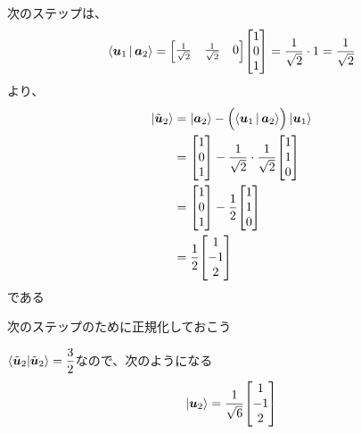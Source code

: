 \documentclass[../book_half_step_linear]{subfiles}
\begin{document}
次のステップは、
\begin{align*}
  \Braket{\vb*{u}_1|\vb*{a}_2} & = \mqty[\frac{1}{\sqrt{2}} & \frac{1}{\sqrt{2}} & 0] \mqty[1 \\ 0 \\ 1] = \frac{1}{\sqrt{2}} \cdot 1 = \frac{1}{\sqrt{2}} \\
\end{align*}
より、
\begin{align*}
  \ket{\tilde{\vb*{u}}_2} & = \ket{\vb*{a}_2} - \Bigl(\Braket{\vb*{u}_1|\vb*{a}_2}\Bigr) \ket{\vb*{u}_1} \\
                          & = \mqty[1                                                                    \\ 0 \\ 1] - \frac{1}{\sqrt{2}} \cdot \dfrac{1}{\sqrt{2}} \mqty[1 \\ 1 \\ 0] \\
                          & = \mqty[1                                                                    \\ 0 \\ 1] - \frac{1}{2} \mqty[1 \\ 1 \\ 0] \\
                          & = \frac{1}{2} \mqty[1                                                        \\ -1 \\ 2]
\end{align*}
である

\br

次のステップのために正規化しておこう

$\braket{\tilde{\vb*{u}}_2|\tilde{\vb*{u}}_2} = \dfrac{3}{2}$なので、次のようになる
\begin{equation*}
  \ket{\vb*{u}_2} = \frac{1}{\sqrt{6}} \mqty[1 \\ -1 \\ 2]
\end{equation*}

\br
\end{document}
